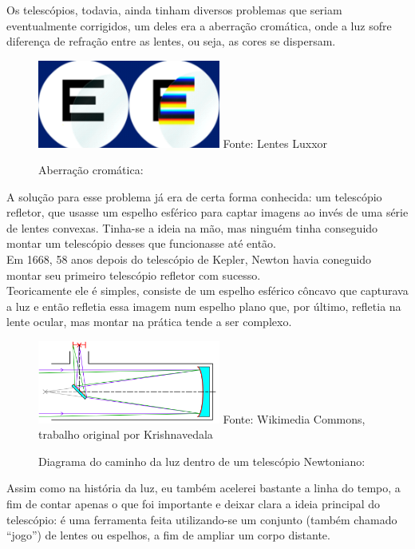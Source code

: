 \documentclass[
  a4paper]{article}
\begin{document}
Os telescópios, todavia, ainda tinham diversos problemas que seriam
eventualmente corrigidos, um deles era a aberração cromática, onde a luz
sofre diferença de refração entre as lentes, ou seja, as cores se
dispersam.

\begin{figure}[!h]
\centering
    \caption{Aberração cromática:} 
    \includegraphics[width=60mm]{../_img/Numero-ABBE-BLOG-2.png}
    \linebreak
    Fonte: Lentes Luxxor
\end{figure}

A solução para esse problema já era de certa forma conhecida: um
telescópio refletor, que usasse um espelho esférico para captar imagens
ao invés de uma série de lentes convexas. Tinha-se a ideia na mão, mas
ninguém tinha conseguido montar um telescópio desses que funcionasse até
então.\\
Em 1668, 58 anos depois do telescópio de Kepler, Newton havia coneguido
montar seu primeiro telescópio refletor com sucesso.\\
Teoricamente ele é simples, consiste de um espelho esférico côncavo que
capturava a luz e então refletia essa imagem num espelho plano que, por
último, refletia na lente ocular, mas montar na prática tende a ser
complexo.

\begin{figure}[!h]
\centering
    \caption{Diagrama do caminho da luz dentro de um telescópio Newtoniano:} 
    \includegraphics[width=60mm]{../_img/800px-Newtonian_telescope2.svg.png}
    \linebreak
    Fonte: Wikimedia Commons, trabalho original por Krishnavedala
\end{figure}

Assim como na história da luz, eu também acelerei bastante a linha do
tempo, a fim de contar apenas o que foi importante e deixar clara a
ideia principal do telescópio: é uma ferramenta feita utilizando-se um
conjunto (também chamado ``jogo'') de lentes ou espelhos, a fim de
ampliar um corpo distante.
\end{document}
